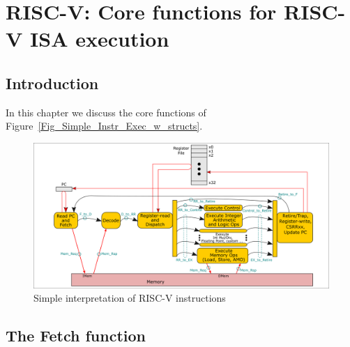 

\chapter{RISC-V: Core functions for RISC-V ISA execution}


\setcounter{page}{1}
\renewcommand{\thepage}{\arabic{chapter}-\arabic{page}}

\label{ch_core_functions}


\section{Introduction}

In this chapter we discuss the core functions of
Figure~\ref{Fig_Simple_Instr_Exec_w_structs}.
\begin{figure}[htbp]
  \centerline{\includegraphics[width=6in,angle=0]{Figures/Fig_Instr_Exec_w_structs}}
  \caption{\label{Fig_Fetch_function_Simple_Instr_Exec}
           Simple interpretation of RISC-V instructions}
\end{figure}


\section{The Fetch function}

\label{Sec_Fetch_function}


